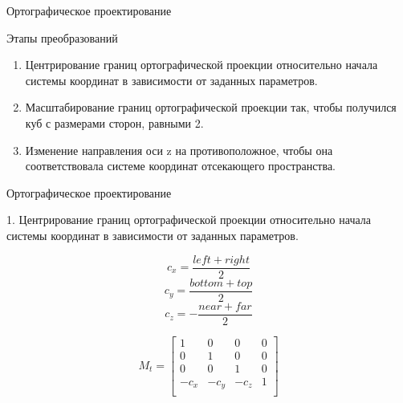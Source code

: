 \documentclass{beamer}
\begin{document}
	\begin{frame}{Ортографическое проектирование}
	
		Этапы преобразований
	\begin{enumerate}
		\item
		Центрирование границ ортографической проекции относительно начала системы координат в зависимости от заданных параметров.
		\item
		Масштабирование границ ортографической проекции так, чтобы получился куб с размерами сторон, равными 2.
		\item 
		Изменение направления оси z на противоположное, чтобы она соответствовала системе координат отсекающего пространства.
	\end{enumerate}



\end{frame}
	\begin{frame}{Ортографическое проектирование}
		
		1. Центрирование границ ортографической проекции относительно начала системы координат в зависимости от заданных параметров.

		\[
			c_x = \frac{left + right}{2}
		\]
		\[
			c_y = \frac{bottom + top}{2}
		\]
		\[
			c_z = - \frac{near + far}{2}
		\]

		\[
			M_t = 
			\begin{bmatrix}
				1 & 0 & 0 & 0 \\
				0 & 1 & 0 & 0 \\
				0 & 0 & 1 & 0 \\
				-c_x & -c_y & -c_z & 1 \\
			\end{bmatrix}	
		\]

	\end{frame}
\end{document}
